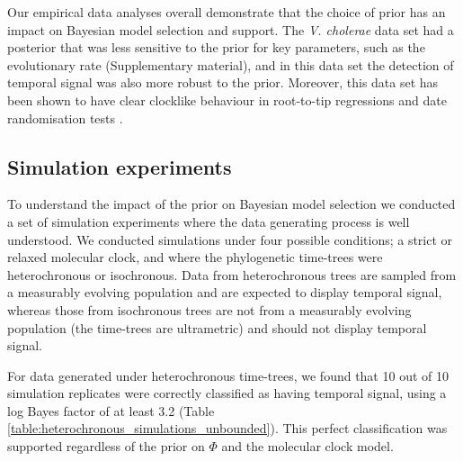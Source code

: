\documentclass[10pt,letterpaper]{article}
\begin{document}
Our empirical data analyses overall demonstrate that the choice of prior has an impact on Bayesian model selection and support. The \textit{V. cholerae} data set had a posterior that was less sensitive to the prior for key parameters, such as the evolutionary rate (Supplementary material), and in this data set the detection of temporal signal was also more robust to the prior. Moreover, this data set has been shown to have clear clocklike behaviour in root-to-tip regressions and date randomisation tests \cite{duchene2016genome}. 

\subsection*{Simulation experiments}
To understand the impact of the prior on Bayesian model selection we conducted a set of simulation experiments where the data generating process is well understood. We conducted simulations under four possible conditions; a strict or relaxed molecular clock, and where the phylogenetic time-trees were heterochronous or isochronous. Data from heterochronous trees are sampled from a measurably evolving population and are expected to display temporal signal, whereas those from isochronous trees are not from a measurably evolving population (the time-trees are ultrametric) and should not display temporal signal. 

For data generated under heterochronous time-trees, we found that 10 out of 10 simulation replicates were correctly classified as having temporal signal, using a log Bayes factor of at least 3.2 (Table \ref{table:heterochronous_simulations_unbounded}). This perfect classification was supported regardless of the prior on $\Phi$ and the molecular clock model. 
\end{document}
